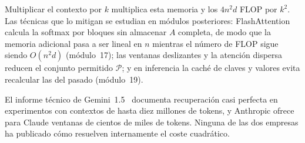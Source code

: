 Multiplicar el contexto por $k$ multiplica esta memoria y los $4n^{2}d$ FLOP por $k^{2}$. Las técnicas que lo mitigan se estudian en módulos posteriores: FlashAttention~\cite{dao} calcula la softmax por bloques sin almacenar $A$ completa, de modo que la memoria adicional pasa a ser lineal en $n$ mientras el número de FLOP sigue siendo $O(n^{2}d)$ (módulo~17); las ventanas deslizantes y la atención dispersa reducen el conjunto permitido $\mathcal{P}$; y en inferencia la caché de claves y valores evita recalcular las del pasado (módulo~19).

\begin{observacion}
El informe técnico de Gemini~1.5~\cite{gemini15} documenta recuperación casi perfecta en experimentos con contextos de hasta diez millones de tokens, y Anthropic ofrece para Claude ventanas de cientos de miles de tokens. Ninguna de las dos empresas ha publicado cómo resuelven internamente el coste cuadrático.
\end{observacion}


